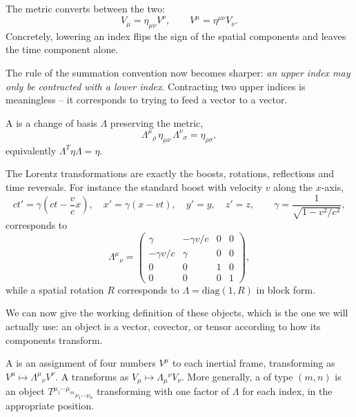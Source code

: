 \begin{definition}
	The metric converts between the two:
	$$
	V_\mu = \eta_{\mu\nu}V^\nu, \qquad V^\mu = \eta^{\mu\nu}V_\nu.
	$$
	Concretely, lowering an index flips the sign of the spatial components and leaves the time component alone.
\end{definition}

The rule of the summation convention now becomes sharper: \emph{an upper index may only be contracted with a lower index}. Contracting two upper indices is meaningless -- it corresponds to trying to feed a vector to a vector.

\begin{definition}
	A  is a change of basis $\Lambda$ preserving the metric,
	$$
	\Lambda^\mu{}_{\rho}\, \eta_{\mu\nu}\, \Lambda^\nu{}_{\sigma} = \eta_{\rho\sigma},
	$$
	equivalently $\Lambda^T \eta \Lambda = \eta$.
\end{definition}

The Lorentz transformations are exactly the boosts, rotations, reflections and time reversals. For instance the standard boost with velocity $v$ along the $x$-axis,
$$
ct' = \gamma\left(ct - \frac{v}{c}x\right), \quad x' = \gamma(x - vt), \quad y'=y,\quad z'=z, \qquad \gamma = \frac{1}{\sqrt{1-v^2/c^2}},
$$
corresponds to
$$
\Lambda^\mu{}_\nu = \begin{pmatrix} \gamma & -\gamma v/c & 0 & 0\\ -\gamma v/c & \gamma & 0&0\\ 0&0&1&0\\0&0&0&1\end{pmatrix},
$$
while a spatial rotation $R$ corresponds to $\Lambda = \mathrm{diag}(1, R)$ in block form.

We can now give the working definition of these objects, which is the one we will actually use: an object is a vector, covector, or tensor according to how its components transform.

\begin{definition}
	A  is an assignment of four numbers $V^\mu$ to each inertial frame, transforming as $V^\mu \mapsto \Lambda^\mu{}_\nu V^\nu$. A  transforms as $V_\mu \mapsto \Lambda_\mu{}^\nu V_\nu$. More generally, a  of type $(m,n)$ is an object $T^{\mu_1\cdots\mu_m}{}_{\nu_1\cdots\nu_n}$ transforming with one factor of $\Lambda$ for each index, in the appropriate position.
\end{definition}

